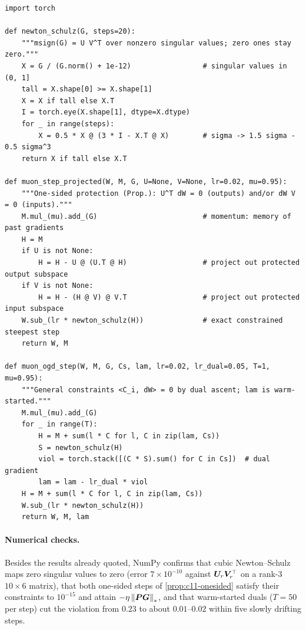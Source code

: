 \begin{lstlisting}[caption={Reference implementation (ours): a Muon step with Newton--Schulz orthogonalization and orthogonal protection, exact for one-sided subspaces and by dual ascent for general linear constraints},label={lst:c11-muonogd-ref}]
import torch

def newton_schulz(G, steps=20):
    """msign(G) = U V^T over nonzero singular values; zero ones stay zero."""
    X = G / (G.norm() + 1e-12)                 # singular values in (0, 1]
    tall = X.shape[0] >= X.shape[1]
    X = X if tall else X.T
    I = torch.eye(X.shape[1], dtype=X.dtype)
    for _ in range(steps):
        X = 0.5 * X @ (3 * I - X.T @ X)        # sigma -> 1.5 sigma - 0.5 sigma^3
    return X if tall else X.T

def muon_step_projected(W, M, G, U=None, V=None, lr=0.02, mu=0.95):
    """One-sided protection (Prop.): U^T dW = 0 (outputs) and/or dW V = 0 (inputs)."""
    M.mul_(mu).add_(G)                         # momentum: memory of past gradients
    H = M
    if U is not None:
        H = H - U @ (U.T @ H)                  # project out protected output subspace
    if V is not None:
        H = H - (H @ V) @ V.T                  # project out protected input subspace
    W.sub_(lr * newton_schulz(H))              # exact constrained steepest step
    return W, M

def muon_ogd_step(W, M, G, Cs, lam, lr=0.02, lr_dual=0.05, T=1, mu=0.95):
    """General constraints <C_i, dW> = 0 by dual ascent; lam is warm-started."""
    M.mul_(mu).add_(G)
    for _ in range(T):
        H = M + sum(l * C for l, C in zip(lam, Cs))
        S = newton_schulz(H)
        viol = torch.stack([(C * S).sum() for C in Cs])  # dual gradient
        lam = lam - lr_dual * viol
    H = M + sum(l * C for l, C in zip(lam, Cs))
    W.sub_(lr * newton_schulz(H))
    return W, M, lam
\end{lstlisting}

\paragraph{Numerical checks.} Besides the results already quoted, NumPy confirms that cubic
Newton--Schulz maps zero singular values to zero (error $7\times10^{-10}$ against $\bm{U}_r\bm{V}_r^{\top}$ on a
rank-$3$ $10\times6$ matrix), that both one-sided steps of \cref{prop:c11-onesided} satisfy their
constraints to $10^{-15}$ and attain $-\eta\left\lVert \bm{P}\bm{G}\right\rVert_*$, and that warm-started duals ($T = 50$
per step) cut the violation from $0.23$ to about $0.01$--$0.02$ within five slowly drifting steps.

